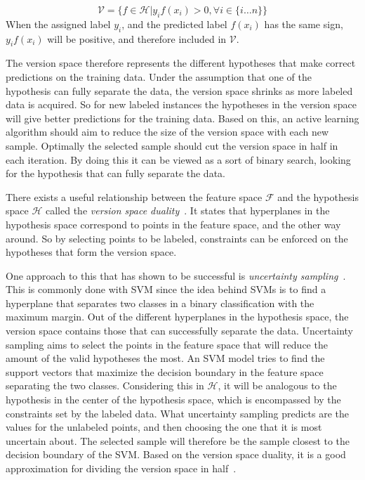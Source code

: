 \begin{equation}\label{eq:version-space}
    \mathcal{V} = \Big \{ f \in \mathcal{H} \Big | y_i f(x_i) > 0, \forall i \in \{i \dots n\} \Big \}
\end{equation}
When the assigned label $y_i$, and the predicted label $f(x_i)$ has the same sign, $y_i f(x_i)$ will be positive, and therefore included in $\mathcal{V}$.

The version space therefore represents the different hypotheses that make correct predictions on the training data.
Under the assumption that one of the hypothesis can fully separate the data, the version space shrinks as more labeled data is acquired.
So for new labeled instances the hypotheses in the version space will give better predictions for the training data.
Based on this, an active learning algorithm should aim to reduce the size of the version space with each new sample. 
Optimally the selected sample should cut the version space in half in each iteration.
By doing this it can be viewed as a sort of binary search, looking for the hypothesis that can fully separate the data.

There exists a useful relationship between the feature space $\mathcal{F}$ and the hypothesis space $\mathcal{H}$ called the \textit{version space duality}~\cite{tong2001support, vapnik1998statistical}.
It states that hyperplanes in the hypothesis space correspond to points in the feature space, and the other way around.
So by selecting points to be labeled, constraints can be enforced on the hypotheses that form the version space.

One approach to this that has shown to be successful is \textit{uncertainty sampling}~\cite{settles2012active}.
This is commonly done with SVM since the idea behind SVMs is to find a hyperplane that separates two classes in a binary classification with the maximum margin.
Out of the different hyperplanes in the hypothesis space, the version space contains those that can successfully separate the data.
Uncertainty sampling aims to select the points in the feature space that will reduce the amount of the valid hypotheses the most.
An SVM model tries to find the support vectors that maximize the decision boundary in the feature space separating the two classes.
Considering this in $\mathcal{H}$, it will be analogous to the hypothesis in the center of the hypothesis space, which is encompassed by the constraints set by the labeled data.
What uncertainty sampling predicts are the values for the unlabeled points, and then choosing the one that it is most uncertain about.
The selected sample will therefore be the sample closest to the decision boundary of the SVM.
Based on the version space duality, it is a good approximation for dividing the version space in half~\cite{settles2012active}.

